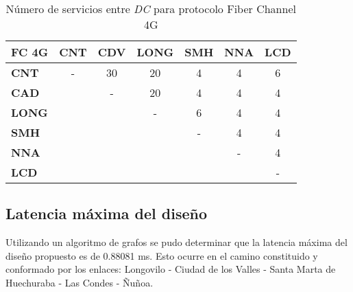  \begin{table}[H]
   \centering
   \begin{tabular}{| l | c | c | c | c | c | c |}
     \hline
     \textbf{FC 4G} & \textbf{CNT} & \textbf{CDV} & \textbf{LONG} & \textbf{SMH} & \textbf{NNA} & \textbf{LCD} \\
     \hline
     \textbf{CNT}  & - & 30 & 20 & 4 & 4 & 6 \\
     \hline
     \textbf{CAD}  &   & - & 20 & 4 & 4 & 4 \\
     \hline
     \textbf{LONG} &   &   & - & 6 & 4 & 4 \\
     \hline
     \textbf{SMH}  &   &   &   & - & 4 & 4 \\
     \hline
     \textbf{NNA}  &   &   &   &   & - & 4 \\
     \hline
     \textbf{LCD}  &   &   &   &   &   & - \\
     \hline
   \end{tabular}
   \caption{Número de servicios entre \emph{DC} para protocolo Fiber Channel 4G}
   \label{tab:FC4G}
 \end{table}

\subsection{Latencia máxima del diseño}
\label{sec:latencia}

Utilizando un algoritmo de grafos se pudo determinar que la latencia
máxima del diseño propuesto es de 0.88081 ms. Esto ocurre en el camino
constituido y conformado por los enlaces: Longovilo - Ciudad de los
Valles - Santa Marta de Huechuraba - Las Condes - Ñuñoa.
